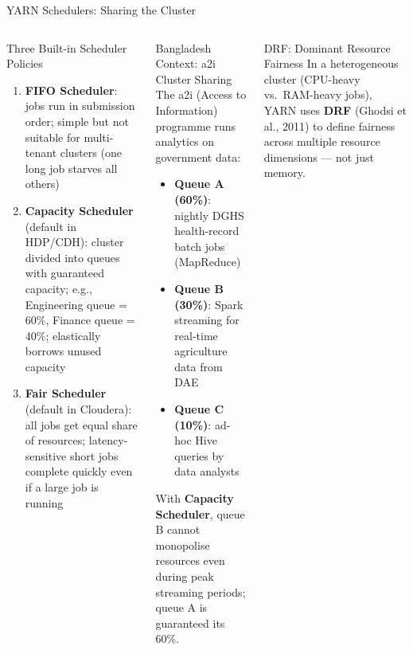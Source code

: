\documentclass[aspectratio=169,10pt]{beamer}
\begin{document}
\begin{frame}{YARN Schedulers: Sharing the Cluster}
  \begin{columns}[T]
      \begin{block}{Three Built-in Scheduler Policies}
        \vspace{4pt}
        \begin{enumerate}
          \item \textbf{FIFO Scheduler}: jobs run in submission order; simple but not suitable for multi-tenant clusters (one long job starves all others)
          \item \textbf{Capacity Scheduler} (default in HDP/CDH): cluster divided into queues with guaranteed capacity; e.g., Engineering queue = 60\%, Finance queue = 40\%; elastically borrows unused capacity
          \item \textbf{Fair Scheduler} (default in Cloudera): all jobs get equal share of resources; latency-sensitive short jobs complete quickly even if a large job is running
        \end{enumerate}
      \end{block}

      \begin{exampleblock}{Bangladesh Context: a2i Cluster Sharing}
        \small The a2i (Access to Information) programme runs analytics on government data:
        \vspace{4pt}
        \begin{itemize}
          \item \textbf{Queue A (60\%)}: nightly DGHS health-record batch jobs (MapReduce)
          \item \textbf{Queue B (30\%)}: Spark streaming for real-time agriculture data from DAE
          \item \textbf{Queue C (10\%)}: ad-hoc Hive queries by data analysts
        \end{itemize}
        \vspace{4pt}
        With \textbf{Capacity Scheduler}, queue B cannot monopolise resources even during peak streaming periods; queue A is guaranteed its 60\%.
      \end{exampleblock}
      \vspace{4pt}
      \begin{alertblock}{DRF: Dominant Resource Fairness}
        \small In a heterogeneous cluster (CPU-heavy vs.\ RAM-heavy jobs), YARN uses \textbf{DRF} (Ghodsi et al., 2011) to define fairness across multiple resource dimensions — not just memory.
      \end{alertblock}
  \end{columns}
\end{frame}
\end{document}

